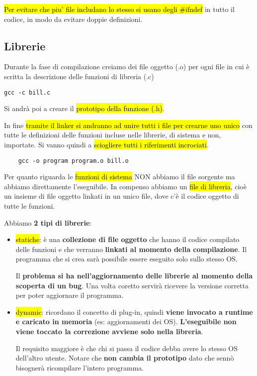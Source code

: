 \hl{Per evitare che piu' file includano lo stesso si usano degli \#ifndef} in tutto il codice, in modo da evitare doppie definizioni.


\subsection{Librerie}

Durante la fase di compilazione creiamo dei file oggetto (.o) per ogni file in cui è scritta la descrizione delle funzioni di libreria (.c)

\begin{lstlisting}
gcc -c bill.c
\end{lstlisting}

Si andrà poi a creare il \hl{prototipo della funzione (.h)}.

In fine \hl{tramite il linker si andranno ad unire tutti i file per crearne uno unico} con tutte le definizioni delle funzioni incluse nelle librerie, di sistema e non, importate. Si vanno quindi a \hl{sciogliere tutti i riferimenti incrociati}.

\begin{lstlisting}
	gcc -o program program.o bill.o
\end{lstlisting}

Per quanto riguarda le \hl{funzioni di sistema} NON abbiamo il file sorgente ma abbiamo direttamente l'eseguibile. In compenso abbiamo un \hl{file di libreria}, cioè un insieme di file oggetto linkati in un unico file, dove c'è il codice oggetto di tutte le funzioni.

Abbiamo \textbf{2 tipi di librerie}:
\begin{itemize}
	\item \hl{statiche}: è una \textbf{collezione di file oggetto} che hanno il codice compilato delle funzioni e che verranno \textbf{linkati al momento della compilazione}. Il programma che si crea sarà possibile essere eseguito solo sullo stesso OS.
		
		Il \textbf{problema si ha nell'aggiornamento delle librerie al momento della scoperta di un bug}. Una volta coretto servirà ricevere la versione corretta per poter aggiornare il programma.
		
	\item \hl{dynamic}: ricordano il concetto di plug-in, quindi \textbf{viene invocato a runtime e caricato in memoria} (es: aggiornamenti dei OS). \textbf{L'eseguibile non viene toccato la correzione avviene solo nella libreria}.
	
		Il requisito maggiore è che chi si passa il codice debba avere lo stesso OS dell'altro utente. Notare che \textbf{non cambia il prototipo} dato che sennò bisognerà ricompilare l'intero programma.
\end{itemize}


